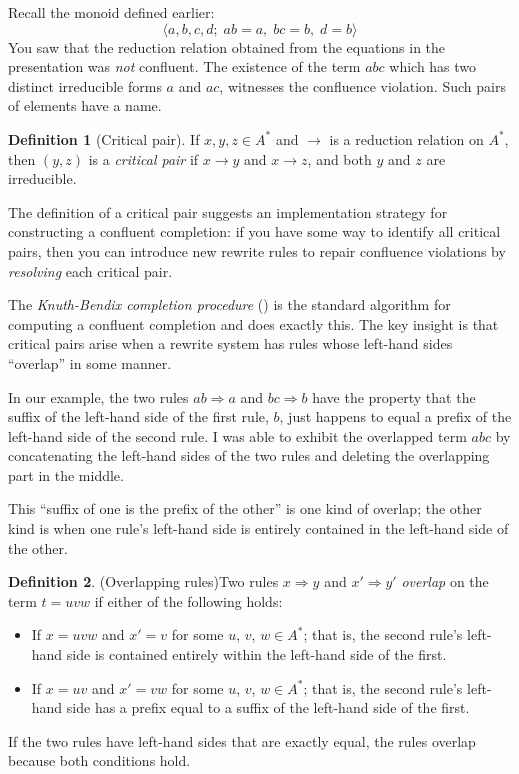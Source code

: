 \documentclass[headsepline,bibliography=totoc]{scrreport}
\theoremstyle{definition}
\theoremstyle{definition}
\newtheorem{definition}{Definition}[chapter]
\theoremstyle{definition}
\begin{document}
Recall the monoid defined earlier:
\[\langle a, b, c, d;\; ab=a,\; bc=b,\; d=b\rangle\]
You saw that the reduction relation obtained from the equations in the presentation was \emph{not} confluent. The existence of the term $abc$ which has two distinct irreducible forms $a$ and $ac$, witnesses the confluence violation. Such pairs of elements have a name.

\begin{definition}[Critical pair] If $x, y, z\in A^*$ and $\rightarrow$ is a reduction relation on $A^*$, then $(y, z)$ is a \emph{critical pair} if $x\rightarrow y$ and $x\rightarrow z$, and both $y$ and $z$ are irreducible.
\end{definition}

The definition of a critical pair suggests an implementation strategy for constructing a confluent completion: if you have some way to identify all critical pairs, then you can introduce new rewrite rules to repair confluence violations by \emph{resolving} each critical pair.

The \emph{Knuth-Bendix completion procedure} (\cite{Knuth1983}) is the standard algorithm for computing a confluent completion and does exactly this. The key insight is that critical pairs arise when a rewrite system has rules whose left-hand sides ``overlap'' in some manner.

In our example, the two rules $ab\Rightarrow a$ and $bc\Rightarrow b$ have the property that the suffix of the left-hand side of the first rule, $b$, just happens to equal a prefix of the left-hand side of the second rule. I was able to exhibit the overlapped term $abc$ by concatenating the left-hand sides of the two rules and deleting the overlapping part in the middle.

This ``suffix of one is the prefix of the other'' is one kind of overlap; the other kind is when one rule's left-hand side is entirely contained in the left-hand side of the other.

\begin{definition}(Overlapping rules)\label{overlappingrules}
Two rules $x\Rightarrow y$ and $x'\Rightarrow y'$ \emph{overlap} on the term $t=uvw$ if either of the following holds:
\begin{itemize}
\item If $x=uvw$ and $x'=v$ for some $u$, $v$, $w\in A^*$; that is, the second rule's left-hand side is contained entirely within the left-hand side of the first.
\item If $x=uv$ and $x'=vw$ for some $u$, $v$, $w\in A^*$; that is, the second rule's left-hand side has a prefix equal to a suffix of the left-hand side of the first.
\end{itemize}
If the two rules have left-hand sides that are exactly equal, the rules overlap because both conditions hold.
\end{definition}
\end{document}
